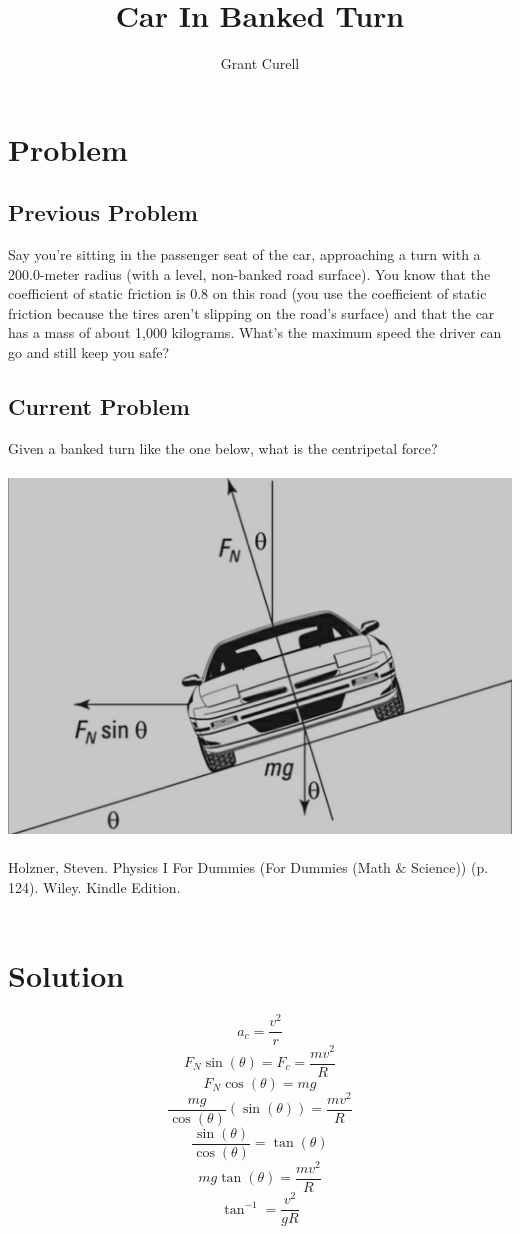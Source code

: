 \documentclass{article}
\title{Car In Banked Turn}
\author{Grant Curell}
\begin{document}
\maketitle{}
\section{Problem}
\subsection{Previous Problem}
Say you’re sitting in the passenger seat of the car, approaching a turn with a 200.0-meter radius (with a level, non-banked road surface). You know that the coefficient of static friction is 0.8 on this road (you use the coefficient of static friction because the tires aren’t slipping on the road’s surface) and that the car has a mass of about 1,000 kilograms. What’s the maximum speed the driver can go and still keep you safe?
\subsection{Current Problem}
Given a banked turn like the one below, what is the centripetal force?
\\\\
\includegraphics[width=\columnwidth]{image}
\\\\
Holzner, Steven. Physics I For Dummies (For Dummies (Math \& Science)) (p. 124). Wiley. Kindle Edition.
\\\\
\section{Solution}
\[ a_c=\frac{v^2}{r} \]
\[ F_N\sin(\theta)=F_c=\frac{mv^2}{R} \]
\[ F_N\cos(\theta)=mg \]
\[ \frac{mg}{\cos(\theta)}(\sin(\theta))=\frac{mv^2}{R} \]
\[ \frac{\sin(\theta)}{\cos(\theta)}=\tan(\theta) \]
\[ mg\tan(\theta)=\frac{mv^2}{R} \]
\[ \tan^{-1}=\frac{v^2}{gR} \]
\end{document}
